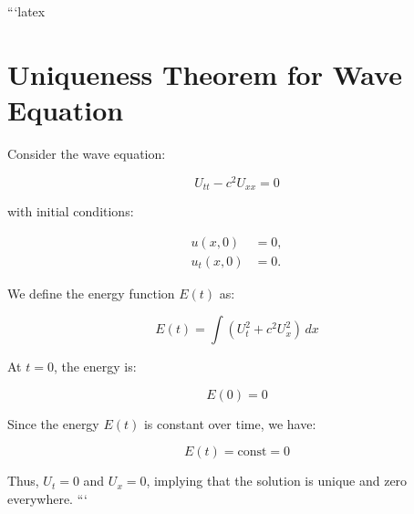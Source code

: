 ```latex
\section*{Uniqueness Theorem for Wave Equation}

Consider the wave equation:

\begin{equation}
    U_{tt} - c^2 U_{xx} = 0
\end{equation}

with initial conditions:

\begin{align}
    u(x, 0) &= 0, \\
    u_t(x, 0) &= 0.
\end{align}

We define the energy function \( E(t) \) as:

\begin{equation}
    E(t) = \int \left( U_t^2 + c^2 U_x^2 \right) \, dx
\end{equation}

At \( t = 0 \), the energy is:

\begin{equation}
    E(0) = 0
\end{equation}

Since the energy \( E(t) \) is constant over time, we have:

\begin{equation}
    E(t) = \text{const} = 0
\end{equation}

Thus, \( U_t = 0 \) and \( U_x = 0 \), implying that the solution is unique and zero everywhere.
```
